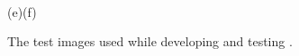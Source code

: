 \begin{figure}[tb]
  \paragraph{}
  \hspace*{0.28\textwidth}(e)\hspace*{0.38\textwidth}(f)
  \caption{\label{fig:testimages}The test images used while developing
    and testing {\octopus}.}
\end{figure}

